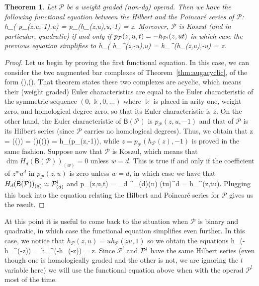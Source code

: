 \documentclass[fleqn, a4paper, twoside]{article}
\makeatletter
\newcommand{\antishriek}{\text{\raisebox{\depth}{\textexclamdown}}}
\newcommand{\eantishriek}{\emph{\text{\raisebox{\depth}{\textexclamdown}}}}
\newcommand{\0}{\langle 0\rangle}
\newcommand{\B}[1]{\mathsf{B}(#1)}
\let\[\@undefined
\DeclareRobustCommand{\[}{\begin{equation}}%
\let\]\@undefined
\DeclareRobustCommand{\]}{\end{equation}}%
\theoremstyle{mytheorem}
\newtheorem{theorem}{Theorem}[section]
\theoremstyle{introthm}
\theoremstyle{mydefinition}
\theoremstyle{mydefinition2}
\theoremstyle{plain} %
\newcommand{\?}{\,?\,}
\newcommand{\kk}{\Bbbk}
\newcommand{\PP}{{\mathcal{P}}}
\theoremstyle{mytheorem}
\theoremstyle{plain} %
\makeatother
\begin{document}
\begin{theorem}
Let $\PP$ be a weight graded (non-dg) operad. Then we have the following
functional equation between the Hilbert and the Poincar\'e series of $\PP$:
\[
h_\PP( p_\PP(z,u,-1),u) = p_\PP(h_\PP(z,u),u,-1) = z. \]
Moreover, $\PP$ is Koszul (and in particular, quadratic) if and only
if $p_\PP(z,u,t) = -h_{\PP^\eantishriek}(z,ut)$ in which case the previous
equation simplifies to
\[
h_\PP( h_{\PP^\eantishriek}(z,-u),u) = h_{\PP^\eantishriek}(h_\PP(z,u),-u) = z. 
\]
\end{theorem}

\begin{proof}
Let us begin by proving the first functional equation. In this case,
we can consider the two augmented bar complexes of Theorem~\ref{thm:augacyclic},
of the form
\[
\PP\circ\B{\PP},\qquad \B{\PP}\circ\PP. 
\]
That theorem states these two complexes are acyclic, which means their
(weight graded) Euler characteristics are equal to the Euler characteristic 
of the symmetric sequence $(0,\kk,0,\ldots)$ where $\kk$ is placed in arity one,
weight zero, and homological degree zero, so that its Euler characteristic is
$z$. On the other hand, the Euler characteristic of $\B{\PP}$ is
$p_\PP(z,u,-1)$ and that of $\PP$ is its Hilbert series (since $\PP$ carries no
homological degrees). Thus, we obtain that 
\[
z = \chi(\PP\circ\B{\PP}) = \chi(\PP)\circ \chi(\B{\PP}) = 
		h_\PP(p_\PP(z,-1)),
\]
while $z = p_\PP(h_\PP(z),-1)$ is proved in the same fashion. Suppose
now that $\PP$ is Koszul, which means that $\dim H_d(\B{\PP})_{(w)} = 0$
unless $w=d$. This is true if and only if the coefficient of $z^wu^d$ in
$p_\PP(z,u)$ is zero unless $w=d$, in which case we have that
$H_d(\B{\PP})_{(d)} \simeq  \PP^\antishriek_{(d)}$ and
\[
p_\PP(z,u,t) = \sum_{d} \dim \PP^\antishriek_{(d)}(n) 
	 (tu)^d = h_{\PP^\antishriek}(z,tu).
\]
Plugging this back into the equation relating the Hilbert and Poincar\'e
series for $\PP$ gives us the result.
\end{proof}

At this point it is useful to come back to the situation when $\PP$
is binary and quadratic, in which case the functional equation
simplifies even further. In this case, we notice that
$h_\PP(z,u) = u h_\PP(zu,1)$ so we obtain the equations  
\[
h_\PP(-h_{\PP^\antishriek}(-z)) = h_{\PP^\antishriek}(-h_\PP(-z)) = z. 
\]
Since $\PP^!$ and $\PP^\antishriek$ have the same Hilbert series (even
though one is homologically graded and the other is not, we are
ignoring the $t$ variable here) we will use the functional equation above
when with the operad $\PP^!$ most of the time.
\end{document}
